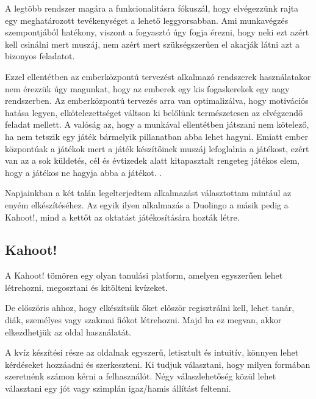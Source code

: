

A legtöbb rendszer magára a funkcionalitásra fókuszál, hogy elvégezzünk rajta egy meghatározott tevékenységet a lehető leggyorsabban. Ami munkavégzés szempontjából hatékony, viszont a fogyasztó úgy fogja érezni, hogy neki ezt azért kell csinálni mert muszáj, nem azért mert szükségszerűen el akarják látni azt a bizonyos feladatot. \newline

Ezzel ellentétben az emberközpontú tervezést alkalmazó rendszerek használatakor nem érezzük úgy magunkat, hogy az emberek egy kis fogaskerekek egy nagy rendszerben. Az emberközpontú tervezés arra van optimalizálva, hogy motivációs hatása legyen, elkötelezettséget váltson ki belőlünk természetesen az elvégzendő feladat mellett. A valóság az, hogy a munkával ellentétben játszani nem kötelező, ha nem tetszik egy játék bármelyik pillanatban abba lehet hagyni. Emiatt ember központúak a játékok mert a játék készítőinek muszáj lefoglalnia a játékost, ezért van az a sok küldetés, cél és évtizedek alatt kitapasztalt rengeteg játékos elem, hogy a játékos ne hagyja abba a játékot. \cite{actionablegamification}.


Napjainkban a két talán legelterjedtem alkalmazást választottam mintául az enyém elkészítéséhez. Az egyik ilyen alkalmazás a Duolingo\cite{duolingo} a másik pedig a Kahoot!\cite{kahoot}, mind a kettőt az oktatást játékosítására hozták létre.

\subsection{Kahoot!}

A Kahoot! tömören egy olyan tanulási platform, amelyen egyszerűen lehet létrehozni, megosztani és kitölteni kvízeket. \newline

De előszöris ahhoz, hogy elkészítsük őket először regisztrálni kell, lehet tanár, diák, személyes vagy szakmai fiókot létrehozni. Majd ha ez megvan, akkor elkezdhetjük az oldal használatát. \newline

A kvíz készítési része az oldalnak egyszerű, letisztult és intuitív, könnyen lehet kérdéseket hozzáadni és szerkeszteni. Ki tudjuk választani, hogy milyen formában szeretnénk számon kérni a felhasználót. Négy válaszlehetőség közül lehet választani egy jót vagy szimplán igaz/hamis állítást feltenni.

